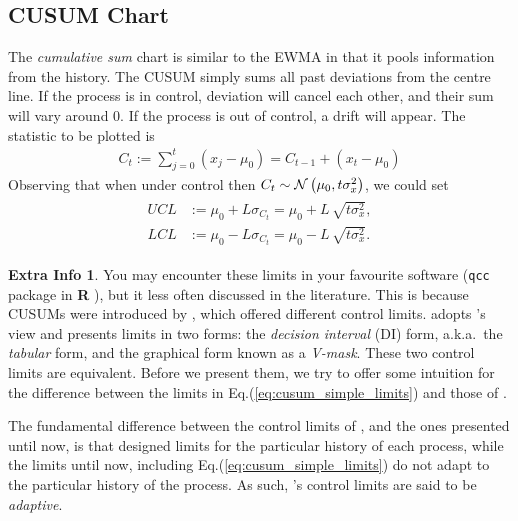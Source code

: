 \documentclass[12pt,a4paper]{report}
\theoremstyle{plain}
\theoremstyle{definition}
\newtheorem{extra}{Extra Info}
\newcommand{\R}{\textnormal{\sffamily\bfseries R }}
\newcommand{\aka}{{a.k.a.\ }}
\newcommand{\rcode}[1]{\texttt{#1}}
\newcommand{\arm}{L}
\providecommand{\DIFaddbegin}{} %
\providecommand{\DIFaddend}{} %
\providecommand{\DIFdelbegin}{} %
\providecommand{\DIFdelend}{} %
\begin{document}
\subsection[CUSUM]{CUSUM Chart}
The \emph{cumulative sum} chart is similar to the EWMA in that it pools information from the history. 
The CUSUM simply sums all past deviations from the centre line.
If the process is in control, deviation will cancel each other, and their sum will vary around $0$. 
If the process is out of control, a drift will appear. 
The statistic to be plotted is 
\begin{align}
	C_t:= \sum_{j=0}^{t}(x_j-\mu_0)=C_{t-1}+ (x_t-\mu_0)
\end{align} 
Observing that when under control then $C_t \sim \mathcal{N}\left(\mu_0, t \sigma_x^2\right)$, we could set 
\begin{align}
\label{eq:cusum_simple_limits}
\begin{split}
	UCL &:= \mu_0 + \arm \sigma_{C_t}= \mu_0 + \arm \, \sqrt{t \sigma_x^2},  \\
	LCL &:= \mu_0 - \arm \sigma_{C_t}= \mu_0 - \arm \, \sqrt{t \sigma_x^2}.
\end{split}
\end{align}
\DIFaddbegin 

\begin{extra}
\DIFaddend You may encounter these limits in your favourite software (\rcode{qcc} package in \R), but it less often discussed in the literature. 
This is because CUSUMs were introduced by \cite{page_continuous_1954}, which offered different control limits. 
\cite{montgomery_introduction_2007} adopts \citeauthor{page_continuous_1954}'s view and presents limits in two forms: the \emph{decision interval} (DI) form, \aka the \emph{tabular} form, and the graphical form known as a \emph{V-mask}.
These two control limits are equivalent. Before we present them, we try to offer some intuition for the difference between the limits in Eq.(\ref{eq:cusum_simple_limits}) and those of \cite{page_continuous_1954}.
\DIFdelbegin %

\DIFdelend The fundamental difference between the control limits of \cite{page_continuous_1954}, and the ones presented until now, is that \citeauthor{page_continuous_1954} designed limits for the particular history of each process, while the limits until now, including Eq.(\ref{eq:cusum_simple_limits}) do not adapt to the particular history of the process.
As such, \citeauthor{page_continuous_1954}'s control limits are said to be \emph{adaptive}.
\DIFaddbegin \end{extra}
\DIFaddend 
\end{document}
